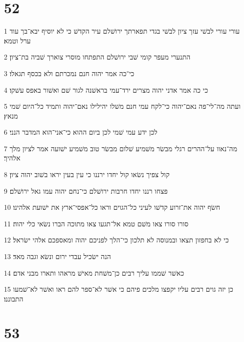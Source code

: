 \chapter{52}

\par 1 עורי עורי לבשׁי עזך ציון לבשׁי בגדי תפארתך ירושׁלם עיר הקדשׁ כי לא יוסיף יבא־בך עוד ערל וטמא׃
\par 2 התנערי מעפר קומי שׁבי ירושׁלם התפתחו מוסרי צוארך שׁביה בת־ציון׃
\par 3 כי־כה אמר יהוה חנם נמכרתם ולא בכסף תגאלו׃
\par 4 כי כה אמר אדני יהוה מצרים ירד־עמי בראשׁנה לגור שׁם ואשׁור באפס עשׁקו׃
\par 5 ועתה מה־לי־פה נאם־יהוה כי־לקח עמי חנם משׁלו יהילילו נאם־יהוה ותמיד כל־היום שׁמי מנאץ׃
\par 6 לכן ידע עמי שׁמי לכן ביום ההוא כי־אני־הוא המדבר הנני׃
\par 7 מה־נאוו על־ההרים רגלי מבשׂר משׁמיע שׁלום מבשׂר טוב משׁמיע ישׁועה אמר לציון מלך אלהיך׃
\par 8 קול צפיך נשׂאו קול יחדו ירננו כי עין בעין יראו בשׁוב יהוה ציון׃
\par 9 פצחו רננו יחדו חרבות ירושׁלם כי־נחם יהוה עמו גאל ירושׁלם׃
\par 10 חשׂף יהוה את־זרוע קדשׁו לעיני כל־הגוים וראו כל־אפסי־ארץ את ישׁועת אלהינו׃
\par 11 סורו סורו צאו משׁם טמא אל־תגעו צאו מתוכה הברו נשׂאי כלי יהוה׃
\par 12 כי לא בחפזון תצאו ובמנוסה לא תלכון כי־הלך לפניכם יהוה ומאספכם אלהי ישׂראל׃
\par 13 הנה ישׂכיל עבדי ירום ונשׂא וגבה מאד׃
\par 14 כאשׁר שׁממו עליך רבים כן־משׁחת מאישׁ מראהו ותארו מבני אדם׃
\par 15 כן יזה גוים רבים עליו יקפצו מלכים פיהם כי אשׁר לא־ספר להם ראו ואשׁר לא־שׁמעו התבוננו׃

\chapter{53}

